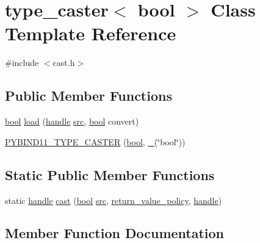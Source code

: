 \hypertarget{classtype__caster_3_01bool_01_4}{}\section{type\+\_\+caster$<$ bool $>$ Class Template Reference}
\label{classtype__caster_3_01bool_01_4}


{\ttfamily \#include $<$cast.\+h$>$}

\subsection*{Public Member Functions}
\begin{DoxyCompactItemize}
\item 
\mbox{\hyperlink{asdl_8h_af6a258d8f3ee5206d682d799316314b1}{bool}} \mbox{\hyperlink{classtype__caster_3_01bool_01_4_a5559d4f858c9ab329b7112fe2cd1d6ff}{load}} (\mbox{\hyperlink{classhandle}{handle}} \mbox{\hyperlink{_s_d_l__opengl__glext_8h_a72e0fdf0f845ded60b1fada9e9195cd7}{src}}, \mbox{\hyperlink{asdl_8h_af6a258d8f3ee5206d682d799316314b1}{bool}} convert)
\item 
\mbox{\hyperlink{classtype__caster_3_01bool_01_4_a0c24496979fb382a33a317d3d2e66aa6}{P\+Y\+B\+I\+N\+D11\+\_\+\+T\+Y\+P\+E\+\_\+\+C\+A\+S\+T\+ER}} (\mbox{\hyperlink{asdl_8h_af6a258d8f3ee5206d682d799316314b1}{bool}}, \mbox{\hyperlink{descr_8h_af114703e20c6527e87163eb2798f74b8}{\+\_\+}}(\char`\"{}bool\char`\"{}))
\end{DoxyCompactItemize}
\subsection*{Static Public Member Functions}
\begin{DoxyCompactItemize}
\item 
static \mbox{\hyperlink{classhandle}{handle}} \mbox{\hyperlink{classtype__caster_3_01bool_01_4_ae5f7bb14916700a713abb0838346202d}{cast}} (\mbox{\hyperlink{asdl_8h_af6a258d8f3ee5206d682d799316314b1}{bool}} \mbox{\hyperlink{_s_d_l__opengl__glext_8h_a72e0fdf0f845ded60b1fada9e9195cd7}{src}}, \mbox{\hyperlink{detail_2common_8h_adde72ab1fb0dd4b48a5232c349a53841}{return\+\_\+value\+\_\+policy}}, \mbox{\hyperlink{classhandle}{handle}})
\end{DoxyCompactItemize}


\subsection{Member Function Documentation}
\mbox{\label{classtype__caster_3_01bool_01_4_ae5f7bb14916700a713abb0838346202d}} 
